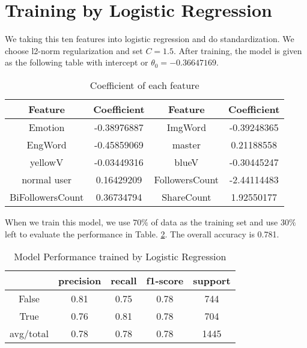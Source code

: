 \section{Training by Logistic Regression}

We taking this ten features into logistic regression and do standardization. We choose l2-norm regularization and set $C=1.5$. After training, the model is given as the following table with intercept or $\theta_0=-0.36647169$.
\begin{table}[!hbp] \centering \label{Tab:featurevectorforlr}
\begin{tabular}{|c|c|c|c|}
\hline
\textbf{Feature} & \textbf{Coefficient} & \textbf{Feature} & \textbf{Coefficient} \\
\hline
Emotion & -0.38976887 & ImgWord & -0.39248365 \\
\hline
EngWord & -0.45859069 & master & 0.21188558 \\ 
\hline
yellowV & -0.03449316 & blueV & -0.30445247 \\
\hline
normal user & 0.16429209 & FollowersCount & -2.44114483\\
\hline
BiFollowersCount & 0.36734794 & ShareCount & 1.92550177\\
\hline
\end{tabular}
\caption{Coefficient of each feature}
\end{table}

When we train this model, we use $70\%$ of data as the training set and use $30\%$ left to evaluate the performance in Table. \ref{Table:PerformanceofLR}. The overall accuracy is 0.781.
\clearpage
\begin{table}[th] \centering 
\begin{tabular}{ccccc}
\toprule
& \textbf{precision} & \textbf{recall} & \textbf{f1-score} & \textbf{support}\\
\midrule
False & 0.81 & 0.75 & 0.78 & 744\\
True  & 0.76 & 0.81 & 0.78 & 704\\
avg/total & 0.78 & 0.78 & 0.78 & 1445\\
\bottomrule
\end{tabular}
\caption{Model Performance trained by Logistic Regression}
\label{Table:PerformanceofLR}
\end{table}



